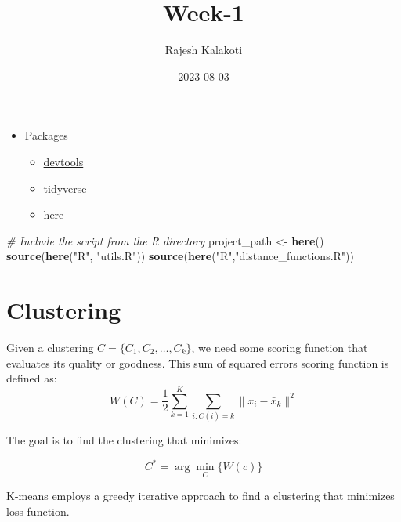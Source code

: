 \documentclass[
]{article}
\title{Week-1}
\author{Rajesh Kalakoti}
\date{2023-08-03}
\newenvironment{Shaded}{\begin{snugshade}}{\end{snugshade}}
\newcommand{\CommentTok}[1]{\textcolor[rgb]{0.56,0.35,0.01}{\textit{#1}}}
\newcommand{\FunctionTok}[1]{\textcolor[rgb]{0.13,0.29,0.53}{\textbf{#1}}}
\newcommand{\NormalTok}[1]{#1}
\newcommand{\OtherTok}[1]{\textcolor[rgb]{0.56,0.35,0.01}{#1}}
\newcommand{\StringTok}[1]{\textcolor[rgb]{0.31,0.60,0.02}{#1}}
\providecommand{\tightlist}{%
  \setlength{\itemsep}{0pt}\setlength{\parskip}{0pt}}
\begin{document}
\maketitle

\begin{itemize}
\tightlist
\item
  Packages

  \begin{itemize}
  \tightlist
  \item
    \href{https://www.r-project.org/nosvn/pandoc/devtools.html}{devtools}
  \item
    \href{https://www.tidyverse.org/packages/}{tidyverse}
  \item
    here
  \end{itemize}
\end{itemize}

\begin{Shaded}
\begin{Highlighting}[]
\CommentTok{\# Include the script from the R directory}
\NormalTok{project\_path }\OtherTok{\textless{}{-}} \FunctionTok{here}\NormalTok{()}
\FunctionTok{source}\NormalTok{(}\FunctionTok{here}\NormalTok{(}\StringTok{"R"}\NormalTok{, }\StringTok{"utils.R"}\NormalTok{))}
\FunctionTok{source}\NormalTok{(}\FunctionTok{here}\NormalTok{(}\StringTok{"R"}\NormalTok{,}\StringTok{"distance\_functions.R"}\NormalTok{))}
\end{Highlighting}
\end{Shaded}

\hypertarget{clustering}{%
\section{Clustering}\label{clustering}}

Given a clustering \(C = \{C_1, C_2, \ldots, C_k\}\), we need some
scoring function that evaluates its quality or goodness. This sum of
squared errors scoring function is defined as:
\[ W(C) = \frac{1}{2} \sum_{k=1}^{K} \sum_{i: C(i)=k} \|x_i - \bar{x}_k\|^2 \]

The goal is to find the clustering that minimizes:

\[ C^* = \arg \min_C \{ W(c) \} \]

K-means employs a greedy iterative approach to find a clustering that
minimizes loss function.
\end{document}

